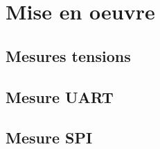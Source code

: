 \section{Mise en oeuvre}

\subsection{Mesures tensions}
{

}

\subsection{Mesure UART}
{

}

\subsection{Mesure SPI}
{

}

